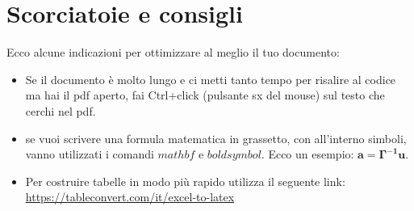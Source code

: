 \section{Scorciatoie e consigli}

Ecco alcune indicazioni per ottimizzare al meglio il tuo documento:

\begin{itemize}
    \item Se il documento è molto lungo e ci metti tanto tempo
    per risalire al codice ma hai il pdf aperto,
    fai Ctrl+click (pulsante sx del mouse) sul testo che cerchi nel pdf.
    \item se vuoi scrivere una formula matematica in grassetto, con all'interno simboli, vanno utilizzati
    i comandi $mathbf$ e $boldsymbol$. Ecco un esempio: $\mathbf{a=\boldsymbol{\Gamma}^{-1}u}$.
    \item Per costruire tabelle in modo più rapido utilizza il seguente link: \url{https://tableconvert.com/it/excel-to-latex}
\end{itemize}

